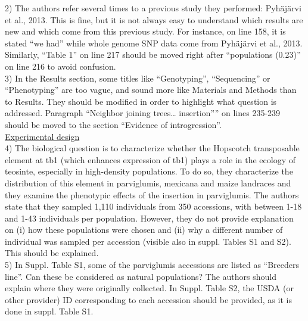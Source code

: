 \documentclass[]{article}
\begin{document}
2) The authors refer several times to a previous study they performed: Pyhäjärvi et al., 2013. This is fine, but it is not always easy to understand which results are new and which come from this previous study. For instance, on line 158, it is stated “we had” while whole genome SNP data come from Pyhäjärvi et al., 2013. Similarly, “Table 1” on line 217 should be moved right after “populations (0.23)” on line 216 to avoid confusion.\\

3) In the Results section, some titles like “Genotyping”, “Sequencing” or “Phenotyping” are too vague, and sound more like Materials and Methods than to Results. They should be modified in order to highlight what question is addressed.
Paragraph “Neighbor joining trees… insertion”” on lines 235-239 should be moved to the section “Evidence of introgression”.\\

\underline{Experimental design}\\

4) The biological question is to characterize whether the Hopscotch transposable element at tb1 (which enhances expression of tb1) plays a role in the ecology of teosinte, especially in high-density populations. To do so, they characterize the distribution of this element in parviglumis, mexicana and maize landraces and they examine the phenotypic effects of the insertion in parviglumis.
The authors state that they sampled 1,110 individuals from 350 accessions, with between 1-18 and 1-43 individuals per population. However, they do not provide explanation on (i) how these populations were chosen and (ii) why a different number of individual was sampled per accession (visible also in suppl. Tables S1 and S2). This should be explained.\\

5) In Suppl. Table S1, some of the parviglumis accessions are listed as “Breeders line”. Can these be considered as natural populations? The authors should explain where they were originally collected. In Suppl. Table S2, the USDA (or other provider) ID corresponding to each accession should be provided, as it is done in suppl. Table S1.\\
\end{document}

